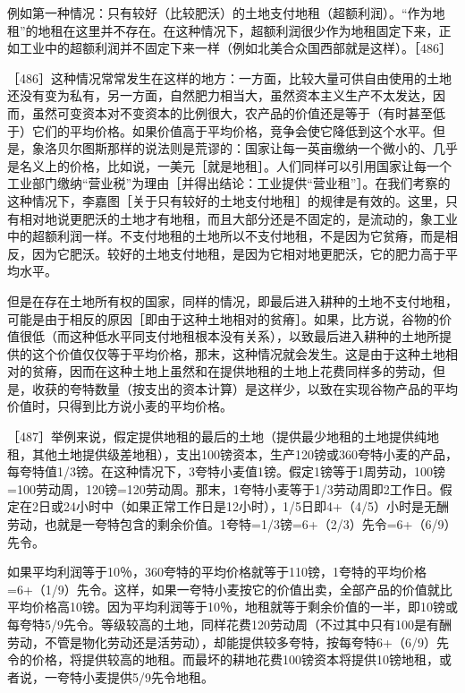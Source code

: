 例如第一种情况：只有较好（比较肥沃）的土地支付地租（超额利润）。“作为地租”的地租在这里并不存在。在这种情况下，超额利润很少作为地租固定下来，正如工业中的超额利润并不固定下来一样（例如北美合众国西部就是这样）。［486］

［486］这种情况常常发生在这样的地方：一方面，比较大量可供自由使用的土地还没有变为私有，另一方面，自然肥力相当大，虽然资本主义生产不太发达，因而，虽然可变资本对不变资本的比例很大，农产品的价值还是等于（有时甚至低于）它们的平均价格。如果价值高于平均价格，竞争会使它降低到这个水平。但是，象洛贝尔图斯那样的说法则是荒谬的：国家让每一英亩缴纳一个微小的、几乎是名义上的价格，比如说，一美元［就是地租］。人们同样可以引用国家让每一个工业部门缴纳“营业税”为理由［并得出结论：工业提供“营业租”］。在我们考察的这种情况下，李嘉图［关于只有较好的土地支付地租］的规律是有效的。这里，只有相对地说更肥沃的土地才有地租，而且大部分还是不固定的，是流动的，象工业中的超额利润一样。不支付地租的土地所以不支付地租，不是因为它贫瘠，而是相反，因为它肥沃。较好的土地支付地租，是因为它相对地更肥沃，它的肥力高于平均水平。

但是在存在土地所有权的国家，同样的情况，即最后进入耕种的土地不支付地租，可能是由于相反的原因［即由于这种土地相对的贫瘠］。如果，比方说，谷物的价值很低（而这种低水平同支付地租根本没有关系），以致最后进入耕种的土地所提供的这个价值仅仅等于平均价格，那末，这种情况就会发生。这是由于这种土地相对的贫瘠，因而在这种土地上虽然和在提供地租的土地上花费同样多的劳动，但是，收获的夸特数量（按支出的资本计算）是这样少，以致在实现谷物产品的平均价值时，只得到比方说小麦的平均价格。

［487］举例来说，假定提供地租的最后的土地（提供最少地租的土地提供纯地租，其他土地提供级差地租），支出100镑资本，生产120镑或360夸特小麦的产品，每夸特值1/3镑。在这种情况下，3夸特小麦值1镑。假定1镑等于1周劳动，100镑=100劳动周，120镑=120劳动周。那末，1夸特小麦等于1/3劳动周即2工作日。假定在2日或24小时中（如果正常工作日是12小时），1/5日即4+（4/5）小时是无酬劳动，也就是一夸特包含的剩余价值。1夸特=1/3镑=6+（2/3）先令=6+（6/9）先令。

如果平均利润等于10％，360夸特的平均价格就等于110镑，1夸特的平均价格=6+（1/9）先令。这样，如果一夸特小麦按它的价值出卖，全部产品的价值就比平均价格高10镑。因为平均利润等于10％，地租就等于剩余价值的一半，即10镑或每夸特5/9先令。等级较高的土地，同样花费120劳动周（不过其中只有100是有酬劳动，不管是物化劳动还是活劳动），却能提供较多夸特，按每夸特6+（6/9）先令的价格，将提供较高的地租。而最坏的耕地花费100镑资本将提供10镑地租，或者说，一夸特小麦提供5/9先令地租。

